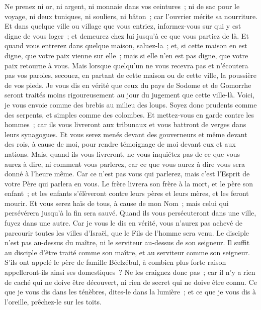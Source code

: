 \begin{multicols}{2}
Ne prenez ni or, ni argent, ni monnaie dans vos ceintures~;
ni de sac pour le voyage, ni deux tuniques, ni souliers, ni bâton~; car l'ouvrier mérite sa nourriture.
Et dans quelque ville ou village que vous entriez, informez-vous sur qui y est digne de vous loger~; et demeurez chez lui jusqu'à ce que vous partiez de là.
Et quand vous entrerez dans quelque maison, saluez-la~;
et, si cette maison en est digne, que votre paix vienne sur elle~; mais si elle n'en est pas digne, que votre paix retourne à vous.
Mais lorsque quelqu'un ne vous recevra pas et n'écoutera pas vos paroles, secouez, en partant de cette maison ou de cette ville, la poussière de vos pieds.
Je vous dis en vérité que ceux du pays de Sodome et de Gomorrhe seront traités moins rigoureusement au jour du jugement que cette ville-là.
Voici, je vous envoie comme des brebis au milieu des loups. Soyez donc prudents comme des serpents, et simples comme des colombes.
Et mettez-vous en garde contre les hommes~; car ils vous livreront aux tribunaux et vous battront de verges dans leurs synagogues.
Et vous serez menés devant des gouverneurs et même devant des rois, à cause de moi, pour rendre témoignage de moi devant eux et aux nations.
Mais, quand ils vous livreront, ne vous inquiétez pas de ce que vous aurez à dire, ni comment vous parlerez, car ce que vous aurez à dire vous sera donné à l'heure même.
Car ce n'est pas vous qui parlerez, mais c'est l'Esprit de votre Père qui parlera en vous.
Le frère livrera son frère à la mort, et le père son enfant~; et les enfants s'élèveront contre leurs pères et leurs mères, et les feront mourir.
Et vous serez haïs de tous, à cause de mon Nom~; mais celui qui persévérera jusqu'à la fin sera sauvé.
Quand ils vous persécuteront dans une ville, fuyez dans une autre. Car je vous le dis en vérité, vous n'aurez pas achevé de parcourir toutes les villes d'Israël, que le Fils de l'homme sera venu.
Le disciple n'est pas au-dessus du maître, ni le serviteur au-dessus de son seigneur.
Il suffit au disciple d'être traité comme son maître, et au serviteur comme son seigneur. S'ils ont appelé le père de famille Béelzébul, à combien plus forte raison appelleront-ils ainsi ses domestiques~?
Ne les craignez donc pas~; car il n'y a rien de caché qui ne doive être découvert, ni rien de secret qui ne doive être connu.
Ce que je vous dis dans les ténèbres, dites-le dans la lumière~; et ce que je vous dis à l'oreille, prêchez-le sur les toits.

\end{multicols}
